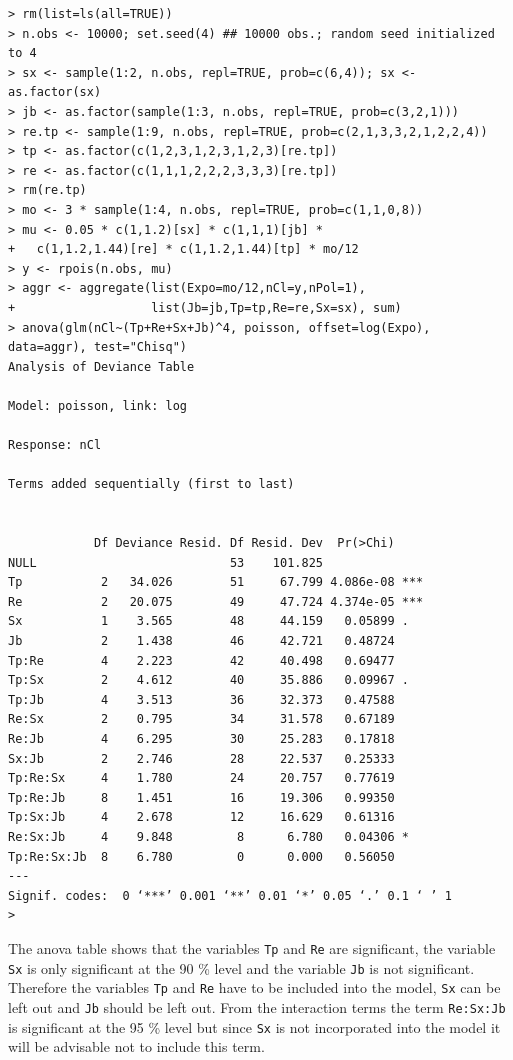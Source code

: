 \documentclass[11pt]{article}
\begin{document}
\begin{verbatim}
> rm(list=ls(all=TRUE))
> n.obs <- 10000; set.seed(4) ## 10000 obs.; random seed initialized to 4
> sx <- sample(1:2, n.obs, repl=TRUE, prob=c(6,4)); sx <- as.factor(sx)
> jb <- as.factor(sample(1:3, n.obs, repl=TRUE, prob=c(3,2,1)))
> re.tp <- sample(1:9, n.obs, repl=TRUE, prob=c(2,1,3,3,2,1,2,2,4))
> tp <- as.factor(c(1,2,3,1,2,3,1,2,3)[re.tp])
> re <- as.factor(c(1,1,1,2,2,2,3,3,3)[re.tp])
> rm(re.tp)
> mo <- 3 * sample(1:4, n.obs, repl=TRUE, prob=c(1,1,0,8))
> mu <- 0.05 * c(1,1.2)[sx] * c(1,1,1)[jb] *
+   c(1,1.2,1.44)[re] * c(1,1.2,1.44)[tp] * mo/12
> y <- rpois(n.obs, mu)
> aggr <- aggregate(list(Expo=mo/12,nCl=y,nPol=1),
+                   list(Jb=jb,Tp=tp,Re=re,Sx=sx), sum)
> anova(glm(nCl~(Tp+Re+Sx+Jb)^4, poisson, offset=log(Expo), data=aggr), test="Chisq")
Analysis of Deviance Table

Model: poisson, link: log

Response: nCl

Terms added sequentially (first to last)


            Df Deviance Resid. Df Resid. Dev  Pr(>Chi)    
NULL                           53    101.825              
Tp           2   34.026        51     67.799 4.086e-08 ***
Re           2   20.075        49     47.724 4.374e-05 ***
Sx           1    3.565        48     44.159   0.05899 .  
Jb           2    1.438        46     42.721   0.48724    
Tp:Re        4    2.223        42     40.498   0.69477    
Tp:Sx        2    4.612        40     35.886   0.09967 .  
Tp:Jb        4    3.513        36     32.373   0.47588    
Re:Sx        2    0.795        34     31.578   0.67189    
Re:Jb        4    6.295        30     25.283   0.17818    
Sx:Jb        2    2.746        28     22.537   0.25333    
Tp:Re:Sx     4    1.780        24     20.757   0.77619    
Tp:Re:Jb     8    1.451        16     19.306   0.99350    
Tp:Sx:Jb     4    2.678        12     16.629   0.61316    
Re:Sx:Jb     4    9.848         8      6.780   0.04306 *  
Tp:Re:Sx:Jb  8    6.780         0      0.000   0.56050    
---
Signif. codes:  0 ‘***’ 0.001 ‘**’ 0.01 ‘*’ 0.05 ‘.’ 0.1 ‘ ’ 1
>
\end{verbatim}

The anova table shows that the variables \verb|Tp| and \verb|Re| are significant, the variable \verb|Sx| is only significant at the 90 \% level and the variable \verb|Jb| is not significant. Therefore the variables \verb|Tp| and \verb|Re| have to be included into the model, \verb|Sx| can be left out and \verb|Jb| should be left out. From the interaction terms the term \verb|Re:Sx:Jb| is significant at the 95 \% level but since \verb|Sx| is not incorporated into the model it will be advisable not to include this term.
\end{document}

